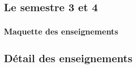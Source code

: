 \documentclass[10pt, a5paper]{report}
\begin{document}
\begin{spacing}{1.0}
\subsection*{Le semestre 3 et 4}

\subsubsection*{Maquette des enseignements}



\subsection*{Détail des enseignements}

\end{spacing}
\end{document}
